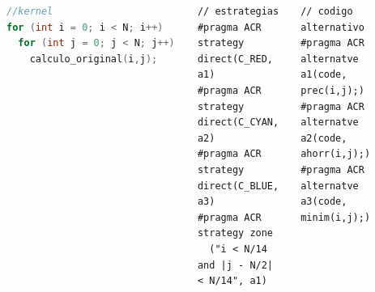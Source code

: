 \documentclass{beamer}\usetheme{Madrid} %
\begin{document}
\begin{frame}[fragile]
\begin{columns}
\begin{center}
\end{center}
\begin{block}{}
\begin{lstlisting}[basicstyle=\scriptsize, language=C]
//kernel
for (int i = 0; i < N; i++)
  for (int j = 0; j < N; j++) 
    calculo_original(i,j);
\end{lstlisting}
\end{block}
\begin{block}{}
\begin{lstlisting}[basicstyle=\scriptsize]
// estrategias
#pragma ACR strategy direct(C_RED, a1)
#pragma ACR strategy direct(C_CYAN, a2)
#pragma ACR strategy direct(C_BLUE, a3)
#pragma ACR strategy zone
  ("i < N/14 and |j - N/2| < N/14", a1)
\end{lstlisting}
\end{block}
\begin{block}{}
\begin{lstlisting}[basicstyle=\scriptsize]
// codigo alternativo
#pragma ACR alternatve a1(code, prec(i,j);)
#pragma ACR alternatve a2(code, ahorr(i,j);)
#pragma ACR alternatve a3(code, minim(i,j);)
\end{lstlisting}
\end{block}
\end{columns}
\end{frame}
\end{document}
